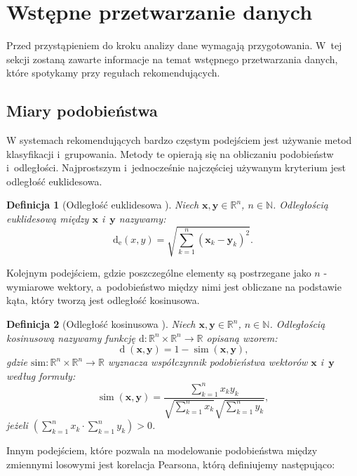 \documentclass[12pt,a4paper]{report}
\newtheorem{df}{Definicja}[chapter]
\newcommand{\setR}{\mathbb{R}}
\newcommand{\setN}{\mathbb{N}}
\newcommand{\similarity}[2]{\operatorname{sim}\left({#1}, {#2} \right)}
\newcommand{\distance}[2]{\operatorname{d}\left({#1}, {#2} \right)}
\newcommand{\distanceee}[2]{\operatorname{d_e}\left({#1}, {#2} \right)}
\begin{document}
\section{Wstępne przetwarzanie danych}
Przed przystąpieniem do kroku analizy dane wymagają przygotowania. W~tej sekcji zostaną zawarte informacje na temat wstępnego przetwarzania danych, które spotykamy przy regułach rekomendujących.

\subsection{Miary podobieństwa}
W systemach rekomendujących bardzo częstym podejściem jest używanie metod klasyfikacji i~grupowania. Metody te opierają się na obliczaniu podobieństw i~odległości.
Najprostszym i~jednocześnie najczęściej używanym kryterium jest odległość euklidesowa.

\begin{df}[Odległość euklidesowa \citep{rsh}]%

Niech $\mathbf{x},\mathbf{y} \in \setR^n $, $n \in\setN$. Odległością euklidesową między $\mathbf{x}$ i~$\mathbf{y}$ nazywamy:
$$
\distanceee{x}{y} = \sqrt{\sum_{k=1}^n(\mathbf{x}_k-\mathbf{y}_k)^2}.
$$
\end{df}

Kolejnym podejściem, gdzie poszczególne elementy są postrzegane jako $n$ - wymiarowe wektory, a~podobieństwo między nimi jest obliczane na podstawie kąta, który tworzą jest odległość kosinusowa.

\begin{df}[Odległość kosinusowa \citep{rsh}] %
Niech $\mathbf{x},\mathbf{y} \in \setR^n $, $n \in\setN$. Odległością kosinusową nazywamy funkcję $ \mathrm{d}: \setR^n \times \setR^n \to \setR$ opisaną wzorem:
$$
\distance{\mathbf{x}}{\mathbf{y}} = 1 - \similarity{\mathbf{x}}{\mathbf{y}},
$$ 
gdzie $\mathrm{sim}: \setR^n \times \setR^n \to \setR$ wyznacza współczynnik podobieństwa wektorów $\mathbf{x}$ i~$\mathbf{y}$ według formuły:
$$
\similarity{\mathbf{x}}{\mathbf{y}} = \frac{\sum_{k=1}^n x_k y_k}{\sqrt{\sum_{k=1}^n x_k}\sqrt{\sum_{k=1}^n y_k}},
$$
jeżeli $(\sum_{k=1}^n x_k \cdot \sum_{k=1}^n y_k) > 0$.
\end{df}
Innym podejściem, które pozwala na modelowanie podobieństwa między zmiennymi losowymi jest korelacja Pearsona, którą definiujemy następująco:
\end{document}
